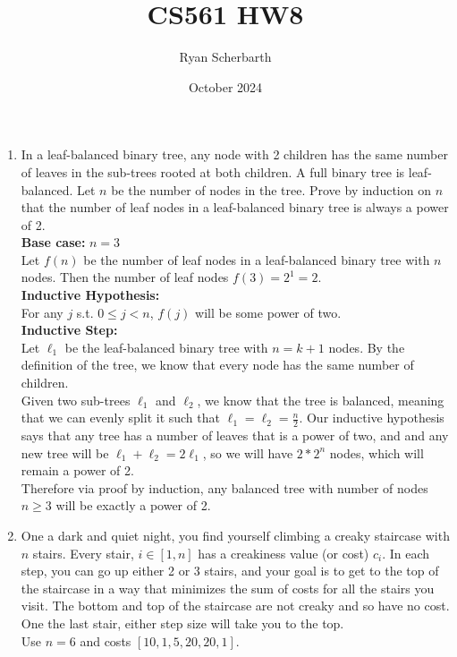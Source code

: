 \documentclass{article}
\title{CS561 HW8}
\author{Ryan Scherbarth}
\date{October 2024}
\begin{document}
\maketitle

\begin{enumerate}

\item In a leaf-balanced binary tree, any node with 2 children has the same number of leaves in the sub-trees rooted at both children. A full binary tree is leaf-balanced. Let $n$ be the number of nodes in the tree. Prove by induction on $n$ that the number of leaf nodes in a leaf-balanced binary tree is always a power of 2. \\

\textbf{Base case:} $n=3$ \\
Let $f(n)$ be the number of leaf nodes in a leaf-balanced binary tree with $n$ nodes. Then the number of leaf nodes $f(3) = 2^1 = 2$. \\

\textbf{Inductive Hypothesis:} \\
For any $j$ s.t. $0 \leq j < n$, $f(j)$ will be some power of two. \\

\textbf{Inductive Step:} \\
Let $\ell_1$ be the leaf-balanced binary tree with $n=k+1$ nodes. By the definition of the tree, we know that every node has the same number of children. \\
\newline 
Given two sub-trees $\ell_1$ and $\ell_2$, we know that the tree is balanced, meaning that we can evenly split it such that $\ell_1 = \ell_2 = \frac{n}{2}$. Our inductive hypothesis says that any tree has a number of leaves that is a power of two, and and any new tree will be $\ell_1 + \ell_2 = 2 \ell_1$, so we will have $2*2^n$ nodes, which will remain a power of 2. \\
\newline 
Therefore via proof by induction, any balanced tree with number of nodes $n \geq 3$ will be exactly a power of 2. \\





\item One a dark and quiet night, you find yourself climbing a creaky staircase with $n$ stairs. Every stair, $i \in [1,n]$ has a creakiness value (or cost) $c_i$. In each step, you can go up either 2 or 3 stairs, and your goal is to get to the top of the staircase in a way that minimizes the sum of costs for all the stairs you visit. The bottom and top of the staircase are not creaky and so have no cost. One the last stair, either step size will take you to the top. \\
Use $n=6$ and costs $[10, 1, 5, 20, 20, 1]$.







\end{enumerate}
\end{document}
